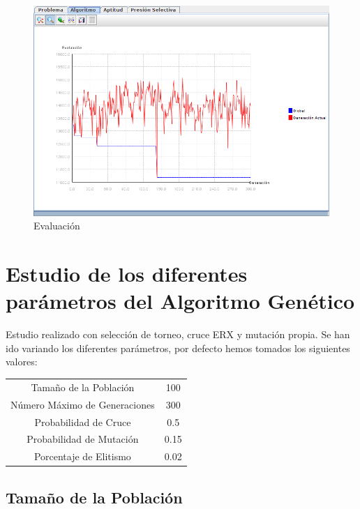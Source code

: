 \documentclass[12pt]{article}
\begin{document}
\begin{figure}[H]
\centering
\includegraphics[scale=0.4]{graficas/fig3graf}
\caption{Evaluación}
\label{fig}
\end{figure} 

\section{Estudio de los diferentes parámetros del Algoritmo Genético}

	Estudio realizado con selección de torneo, cruce ERX y mutación propia. Se han ido variando los diferentes parámetros, por defecto hemos tomados los siguientes valores:

\begin{table}[H]
\begin{center}
\begin{tabular}{|cc|} \hline
Tamaño de la Población   & 100  \\  
Número Máximo de Generaciones  &  300 \\
Probabilidad de Cruce & 0.5 \\
Probabilidad de Mutación & 0.15 \\
Porcentaje de Elitismo & 0.02 \\ \hline
\end{tabular}
\end{center}
\end{table}


\subsection{Tamaño de la Población}
\end{document}
